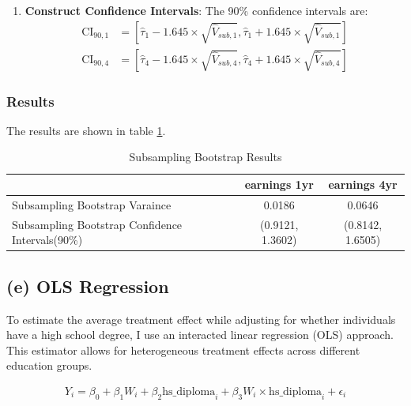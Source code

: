 \documentclass[11pt]{article}
\numberwithin{equation}{section}
\begin{document}
\begin{algorithm}
\begin{enumerate}
        \item \textbf{Construct Confidence Intervals}: The 90\% confidence intervals are:
        \begin{align}
            \text{CI}_{90,1} &= \left[\hat{\tau}_1 - 1.645 \times \sqrt{\hat{V}_{sub,1}}, \hat{\tau}_1 + 1.645 \times \sqrt{\hat{V}_{sub,1}}\right] \\
            \text{CI}_{90,4} &= \left[\hat{\tau}_4 - 1.645 \times \sqrt{\hat{V}_{sub,4}}, \hat{\tau}_4 + 1.645 \times \sqrt{\hat{V}_{sub,4}}\right]
        \end{align}
    \end{enumerate}
\end{algorithm}

\subsubsection{Results}

The results are shown in table \ref{tab:subsampling_bootstrap_results}.

\begin{table}[h]
    \centering
    \begin{tabular}{lcc}
        \hline
         & earnings 1yr & earnings 4yr \\
        \hline
        Subsampling Bootstrap Varaince & 0.0186 & 0.0646 \\
        Subsampling Bootstrap Confidence Intervals(90\%) & (0.9121, 1.3602) & (0.8142, 1.6505) \\
        \hline
    \end{tabular}
    \caption{\label{tab:subsampling_bootstrap_results}Subsampling Bootstrap Results}
\end{table}

\subsection{(e) OLS Regression}

To estimate the average treatment effect while adjusting for whether individuals have a high school degree, I use an interacted linear regression (OLS) approach. 
This estimator allows for heterogeneous treatment effects across different education groups.

\begin{align}
    Y_i = \beta_0 + \beta_1 W_i + \beta_2 \text{hs\_diploma}_i + \beta_3 W_i \times \text{hs\_diploma}_i + \epsilon_i
\end{align}
\end{document}
